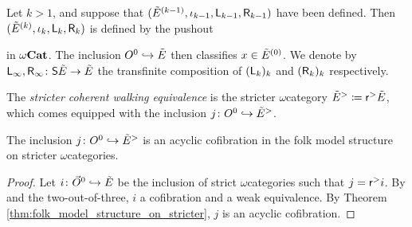 \begin{dfn}
    Let \( k > 1 \), and suppose that \( (\tilde E^{(k - 1)}, \iota_{k - 1}, \mathsf{L}_{k - 1}, \mathsf{R}_{k - 1}) \) have been defined.
    Then \( (\tilde E^{(k)}, \iota_{k}, \mathsf{L}_{k}, \mathsf{R}_{k}) \) is defined by the pushout
    \begin{center}
    \end{center}
    in \( {\omega\mathbf{Cat}} \).
    The inclusion \( O^{0} \hookrightarrow \tilde E \) then classifies \( x \in \tilde E^{(0)} \).
    We denote by \( \mathsf{L}_\infty, \mathsf{R}_\infty \colon \mathsf{S}{\tilde E} \to \tilde E \) the transfinite composition of \( (\mathsf{L}_k)_k \) and \( (\mathsf{R}_k)_k \) respectively.
\end{dfn}

\begin{dfn} 
    The \emph{stricter coherent walking equivalence} is the stricter \( \omega \)\nbd category \( \tilde E^> \coloneqq \mathsf{r}^{>} \tilde E \), which comes equipped with the inclusion \( j \colon O^{0} \hookrightarrow \tilde E^> \).
\end{dfn}

\begin{lem} \label{lem:inclusion_into_stricter_is_equivalence}
    The inclusion \( j \colon O^{0} \hookrightarrow \tilde E^> \) is an acyclic cofibration in the folk model structure on stricter \( \omega \)\nbd categories.
\end{lem}
\begin{proof}
    Let \( i \colon \vec{O}^{0} \hookrightarrow \tilde E \) be the inclusion of strict \( \omega \)\nbd categories such that \( j = \mathsf{r}^{>} i \).
    By \cite[Remark 1.29, Theorem 1.33]{hadzihasanovic2024model} and the two-out-of-three, \( i \) a cofibration and a weak equivalence.
    By Theorem \ref{thm:folk_model_structure_on_stricter}, \( j \) is an acyclic cofibration. 
\end{proof}

